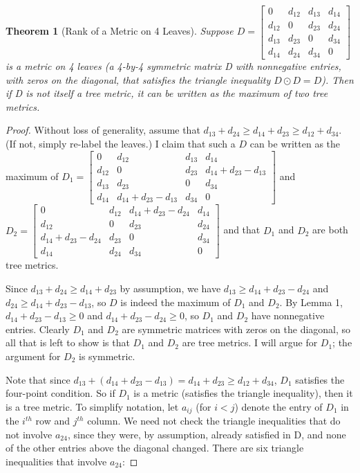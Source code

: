 \documentclass[12pt]{amsart}
\newtheorem{theorem}{Theorem}
\begin{document}
\begin{theorem}[Rank of a Metric on 4 Leaves]
Suppose $D = \begin{bmatrix} 0&d_{12}&d_{13}&d_{14} \\ d_{12}&0&d_{23}&d_{24} \\ d_{13}&d_{23}&0&d_{34} \\ d_{14}&d_{24}&d_{34}&0 \end{bmatrix}$ is a metric on 4 leaves (a 4-by-4 symmetric matrix D with nonnegative entries, with zeros on the diagonal, that satisfies the triangle inequality $D \odot D = D$). Then if D is not itself a tree metric, it can be written as the maximum of two tree metrics. 
\end{theorem}
\begin{proof} Without loss of generality, assume that $d_{13}+d_{24} \geq d_{14}+d_{23} \geq d_{12}+d_{34}$. (If not, simply re-label the leaves.) I claim that such a $D$ can be written as the maximum of $D_{1} = \begin{bmatrix} 0&d_{12}&d_{13}&d_{14} \\ d_{12}&0&d_{23}&d_{14}+d_{23}-d_{13} \\ d_{13}&d_{23}&0&d_{34} \\ d_{14}&d_{14}+d_{23}-d_{13}&d_{34}&0 \end{bmatrix}$ and $D_{2} = \begin{bmatrix} 0&d_{12}&d_{14}+d_{23}-d_{24}&d_{14} \\ d_{12}&0&d_{23}&d_{24} \\ d_{14}+d_{23}-d_{24}&d_{23}&0&d_{34} \\ d_{14}&d_{24}&d_{34}&0 \end{bmatrix}$ and that $D_{1}$ and $D_{2}$ are both tree metrics.

Since $d_{13}+d_{24} \geq d_{14}+d_{23}$ by assumption, we have $d_{13} \geq d_{14}+d_{23}-d_{24}$ and $d_{24} \geq d_{14}+d_{23}-d_{13}$, so $D$ is indeed the maximum of $D_{1}$ and $D_{2}$. By Lemma 1, $d_{14}+d_{23}-d_{13} \geq 0$ and $d_{14}+d_{23}-d_{24} \geq 0$, so $D_{1}$ and $D_{2}$ have nonnegative entries. Clearly $D_{1}$ and $D_{2}$ are symmetric matrices with zeros on the diagonal, so all that is left to show is that $D_{1}$ and $D_{2}$ are tree metrics. I will argue for $D_{1}$; the argument for $D_{2}$ is symmetric.

Note that since $d_{13}+(d_{14}+d_{23}-d_{13}) = d_{14}+d_{23} \geq d_{12}+d_{34}$, $D_{1}$ satisfies the four-point condition. So if $D_{1}$ is a metric (satisfies the triangle inequality), then it is a tree metric. To simplify notation, let $a_{ij}$ (for $i < j$) denote the entry of $D_{1}$ in the $i^{th}$ row and $j^{th}$ column. We need not check the triangle inequalities that do not involve $a_{24}$, since they were, by assumption, already satisfied in D, and none of the other entries above the diagonal changed. There are six triangle inequalities that involve $a_{24}$:


\end{proof}
\end{document}
